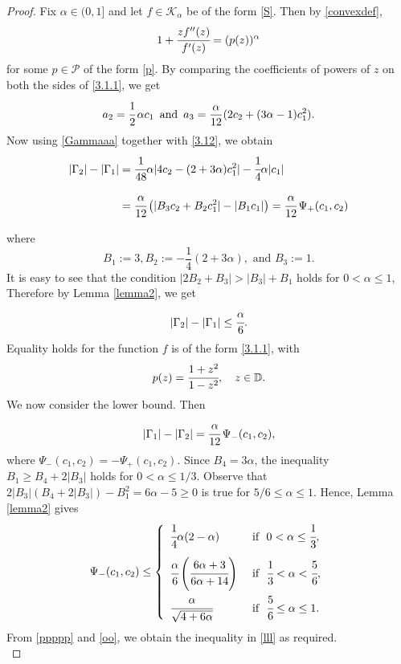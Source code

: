 \documentclass[a4paper,12pt]{amsart}
\theoremstyle{definition}
\numberwithin{equation}{section}
\begin{document}
\begin{proof}
Fix $\alpha \in (0,1]$ and let $f\in \mathcal{K}_{\alpha}$ be of the form \eqref{S}. Then by \eqref{convexdef},
\begin{equation}\label{3.1.1}
1+\cfrac{zf''(z)}{f'(z)}=(p(z))^\alpha
\end{equation}
for some $p \in \mathcal{P}$ of the form \eqref{p}. By comparing the coefficients of powers of $z$ on both the sides of \eqref{3.1.1}, we get
	\begin{equation}\label{3.12}
a_2=\cfrac{1}{2}\,\alpha c_1 \,\,\, \text{and} \,\,\, a_3=\frac{\alpha}{12}(2c_2+(3\alpha-1)c_1^2).
	\end{equation}
Now using \eqref{Gammaaa} together with \eqref{3.12}, we obtain
\begin{equation*}
\begin{aligned}
|\Gamma_2|-|\Gamma_1| &= \cfrac{1}{48}\alpha|4c_2-(2+3\alpha)c_1^2|-\cfrac{1}{4}\alpha |c_1| \\[2mm]
&=\cfrac{\alpha}{12}\left(|B_3 c_2+B_2 c_1^2|-|B_1 c_1|\right)= \cfrac{\alpha}{12} \, \Psi_+(c_1,c_2) \\[2mm]
\end{aligned}
\end{equation*}
where  
$$
B_1:=3, B_2:=-\frac{1}{4}(2+3\alpha), \mbox{ and } B_3:=1.
$$	
It is easy to see that the condition $|2B_2+B_3| > |B_3|+B_1$ holds for $0 < \alpha \leq 1$, Therefore by Lemma \ref{lemma2}, we get 	
$$
	|\Gamma_2|-|\Gamma_1| \leq \cfrac{\alpha}{6}.
$$
Equality holds for the function $f$ is of the form \eqref{3.1.1}, with 
$$p(z)=\cfrac{1+z^2}{1-z^2}, \quad z \in \mathbb{D}.$$	
\noindent We now consider the lower bound. Then
\begin{equation}\label{ppppp}
|\Gamma_1|-|\Gamma_2|=\cfrac{\alpha}{12} \, \Psi_-(c_1,c_2),
\end{equation}
where $\Psi_-(c_1,c_2)=-\Psi_+(c_1,c_2)$. Since $B_4=3\alpha$, the inequality $B_1 \geq B_4+2|B_3|$ holds for $0< \alpha \leq 1/3$. Observe that $2|B_3|(B_4+2|B_3|)-B_1^2=6\alpha-5 \geq 0$ is true for $5/6 \leq \alpha \leq 1$. Hence, Lemma \ref{lemma2} gives
\begin{equation}\label{oo}
\Psi_-(c_1,c_2) \leq \left \{
	\begin{array}{lll}
		  \cfrac{1}{4}\alpha(2-\alpha)  & {\mbox{ if }} \,\,  0 < \alpha \leq \cfrac{1}{3},
		\\[4mm]
		   \cfrac{\alpha}{6} \left( \cfrac{6\alpha+3}{6\alpha+14} \right)    &  {\mbox{ if }} \,\, \cfrac{1}{3} < \alpha < \cfrac{5}{6}, \\[4mm]
		 \cfrac{\alpha}{\sqrt{4+6\alpha}} &  {\mbox{ if }} \,\, \cfrac{5}{6} \leq \alpha \leq 1.
	\end{array}
	\right.
\end{equation}
From \eqref{ppppp} and \eqref{oo}, we obtain the inequality in \eqref{lll} as required.\\


\end{proof}
\end{document}
